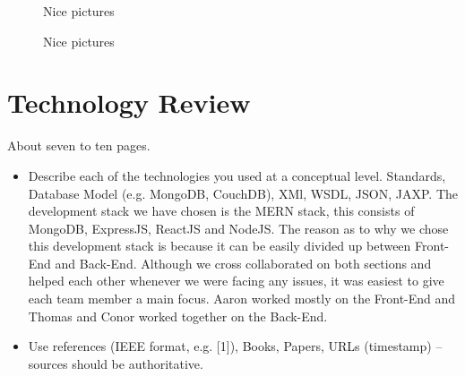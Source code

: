 \begin{figure}
  \centering
  \hspace{1.5cm}
  \caption{Nice pictures}
  \label{tikz:graphs}
\end{figure}


\begin{figure}
  \centering
  \caption{Nice pictures}
  \label{tikz:graphs}
\end{figure}


\chapter{Technology Review}
About seven to ten pages.
\begin{itemize}
\item Describe each of the technologies you used at a conceptual level. Standards, Database Model (e.g. MongoDB, CouchDB), XMl, WSDL, JSON, JAXP.
The development stack we have chosen is the MERN stack, this consists of MongoDB, ExpressJS, ReactJS and NodeJS. The reason as to why we chose this development stack is because it can be easily divided up between Front-End and Back-End. Although we cross collaborated on both sections and helped each other whenever we were facing any issues, it was easiest to give each team member a main focus. Aaron worked mostly on the Front-End and Thomas and Conor worked together on the Back-End.


\item Use references (IEEE format, e.g. [1]), Books, Papers, URLs (timestamp) – sources should be authoritative. 
\end{itemize}

